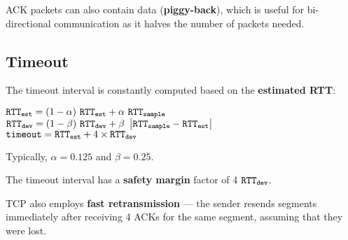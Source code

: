 ACK packets can also contain data (\textbf{piggy-back}), which is useful for bi-directional communication
as it halves the number of packets needed.

\subsection{Timeout}
The timeout interval is constantly computed based on the \textbf{estimated RTT}:

\begin{boxed}[l]
    $\code{RTT}_\code{est} = (1- \alpha) \ \code{RTT}_\code{est} + \alpha \ \code{RTT}_\code{sample}$ \\
    $\code{RTT}_\code{dev} = (1- \beta) \ \code{RTT}_\code{dev} + \beta \  \left| \code{RTT}_\code{sample} - \code{RTT}_\code{est} \right| $ \\
    $\texttt{timeout} = \texttt{RTT}_{\texttt{est}} + 4 \times \texttt{RTT}_{\texttt{dev}}$
\end{boxed}

Typically, $\alpha = 0.125$ and $\beta = 0.25$.

The timeout interval has a \textbf{safety margin} factor of 4 $\texttt{RTT}_{\texttt{dev}}$.

TCP also employs \textbf{fast retransmission} --- the sender resends segments immediately
after receiving 4 ACKs for the same segment, assuming that they were lost.